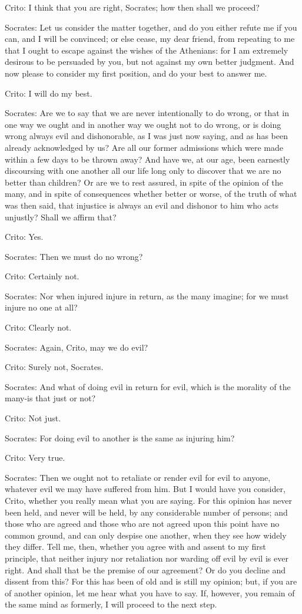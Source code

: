Crito: I think that you are right, Socrates; how then shall we proceed?

Socrates: Let us consider the matter together, and do you either refute
me if you can, and I will be convinced; or else cease, my dear friend,
from repeating to me that I ought to escape against the wishes of
the Athenians: for I am extremely desirous to be persuaded by you,
but not against my own better judgment. And now please to consider
my first position, and do your best to answer me. 

Crito: I will do my best. 

Socrates: Are we to say that we are never intentionally to do wrong, or
that in one way we ought and in another way we ought not to do wrong,
or is doing wrong always evil and dishonorable, as I was just now
saying, and as has been already acknowledged by us? Are all our former
admissions which were made within a few days to be thrown away? And
have we, at our age, been earnestly discoursing with one another all
our life long only to discover that we are no better than children?
Or are we to rest assured, in spite of the opinion of the many, and
in spite of consequences whether better or worse, of the truth of
what was then said, that injustice is always an evil and dishonor
to him who acts unjustly? Shall we affirm that? 

Crito: Yes. 

Socrates: Then we must do no wrong? 

Crito: Certainly not. 

Socrates: Nor when injured injure in return, as the many imagine; for we
must injure no one at all? 

Crito: Clearly not. 

Socrates: Again, Crito, may we do evil? 

Crito: Surely not, Socrates. 

Socrates: And what of doing evil in return for evil, which is the morality
of the many-is that just or not? 

Crito: Not just. 

Socrates: For doing evil to another is the same as injuring him?

Crito: Very true. 

Socrates: Then we ought not to retaliate or render evil for evil to anyone,
whatever evil we may have suffered from him. But I would have you
consider, Crito, whether you really mean what you are saying. For
this opinion has never been held, and never will be held, by any considerable
number of persons; and those who are agreed and those who are not
agreed upon this point have no common ground, and can only despise
one another, when they see how widely they differ. Tell me, then,
whether you agree with and assent to my first principle, that neither
injury nor retaliation nor warding off evil by evil is ever right.
And shall that be the premise of our agreement? Or do you decline
and dissent from this? For this has been of old and is still my opinion;
but, if you are of another opinion, let me hear what you have to say.
If, however, you remain of the same mind as formerly, I will proceed
to the next step. 


